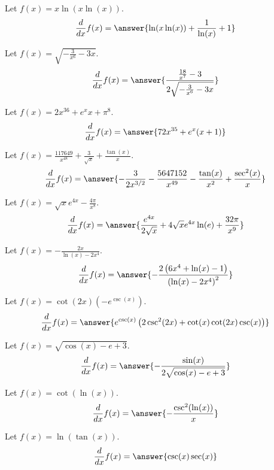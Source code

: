 \documentclass{ximera}
\begin{document}
\begin{shuffle}
\begin{exercise}
Let $f(x)=x \ln (x \ln (x))$.
\[
\ddx f(x) = \answer{\ln (x \ln (x))+\frac{1}{\ln (x)}+1}
\]
\end{exercise}

\begin{exercise}
Let $f(x)=\sqrt{-\frac{3}{x^6}-3 x}$.
\[
\ddx f(x) = \answer{\frac{\frac{18}{x^7}-3}{2 \sqrt{-\frac{3}{x^6}-3 x}}}
\]
\end{exercise}

\begin{exercise}
Let $f(x)=2 x^{36}+e^x x+\pi ^8$.
\[
\ddx f(x) = \answer{72 x^{35}+e^x (x+1)}
\]
\end{exercise}

\begin{exercise}
Let $f(x)=\frac{117649}{x^{48}}+\frac{3}{\sqrt{x}}+\frac{\tan (x)}{x}$.
\[
\ddx f(x) = \answer{-\frac{3}{2 x^{3/2}}-\frac{5647152}{x^{49}}-\frac{\tan (x)}{x^2}+\frac{\sec ^2(x)}{x}}
\]
\end{exercise}

\begin{exercise}
Let $f(x)=\sqrt{x} e^{4 x}-\frac{4 \pi }{x^8}$.
\[
\ddx f(x) = \answer{\frac{e^{4 x}}{2 \sqrt{x}}+4 \sqrt{x} e^{4 x} \ln (e)+\frac{32 \pi }{x^9}}
\]
\end{exercise}

\begin{exercise}
Let $f(x)=-\frac{2 x}{\ln (x)-2 x^4}$.
\[
\ddx f(x) = \answer{-\frac{2 \left(6 x^4+\ln (x)-1\right)}{\left(\ln (x)-2 x^4\right)^2}}
\]
\end{exercise}

\begin{exercise}
Let $f(x)=\cot (2 x) \left(-e^{\csc (x)}\right)$.
\[
\ddx f(x) = \answer{e^{\csc (x)} \left(2 \csc ^2(2 x)+\cot (x) \cot (2 x) \csc (x)\right)}
\]
\end{exercise}

\begin{exercise}
Let $f(x)=\sqrt{\cos (x)-e+3}$.
\[
\ddx f(x) = \answer{-\frac{\sin (x)}{2 \sqrt{\cos (x)-e+3}}}
\]
\end{exercise}

\begin{exercise}
Let $f(x)=\cot (\ln (x))$.
\[
\ddx f(x) = \answer{-\frac{\csc ^2(\ln (x))}{x}}
\]
\end{exercise}

\begin{exercise}
Let $f(x)=\ln (\tan (x))$.
\[
\ddx f(x) = \answer{\csc (x) \sec (x)}
\]
\end{exercise}


\end{shuffle}
\end{document}
